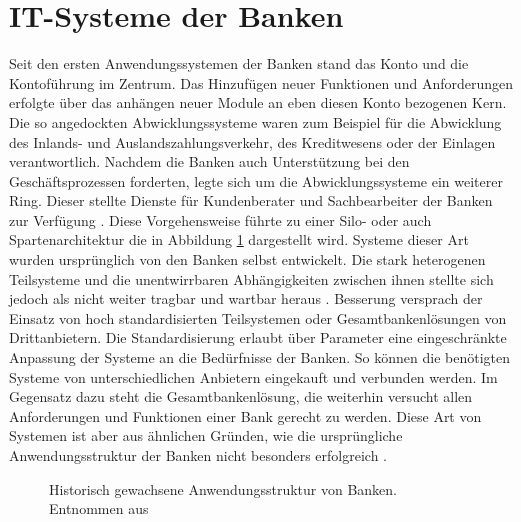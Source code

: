 \documentclass[12pt,oneside,a4paper,parskip]{scrbook}
\begin{document}
\section{IT-Systeme der Banken}
Seit den ersten Anwendungssystemen der Banken stand das Konto und die Kontoführung im Zentrum. Das Hinzufügen neuer Funktionen und Anforderungen erfolgte über das anhängen neuer Module an eben diesen Konto bezogenen Kern. Die so angedockten Abwicklungssysteme waren zum Beispiel für die Abwicklung des Inlands- und Auslandszahlungsverkehr, des Kreditwesens oder der Einlagen verantwortlich. Nachdem die Banken auch Unterstützung bei den Geschäftsprozessen forderten, legte sich um die Abwicklungssysteme ein weiterer Ring. Dieser stellte Dienste für Kundenberater und Sachbearbeiter der Banken zur Verfügung \cite[18-20]{ITidF}\cite{SuPdIiB}. Diese Vorgehensweise führte zu einer Silo- oder auch Spartenarchitektur die in Abbildung \ref{zwiebel} dargestellt wird. Systeme dieser Art wurden ursprünglich von den Banken selbst entwickelt. Die stark heterogenen Teilsysteme und die unentwirrbaren Abhängigkeiten zwischen ihnen stellte sich jedoch als nicht weiter tragbar und wartbar heraus \cite{bankEnzy}\cite{SuPdIiB}\cite[52]{ITidF}. Besserung versprach der Einsatz von hoch standardisierten Teilsystemen oder Gesamtbankenlösungen von Drittanbietern. Die Standardisierung erlaubt über Parameter eine eingeschränkte Anpassung der Systeme an die Bedürfnisse der Banken. So können die benötigten Systeme von unterschiedlichen Anbietern eingekauft und verbunden werden. Im Gegensatz dazu steht die Gesamtbankenlösung, die weiterhin versucht allen Anforderungen und Funktionen einer Bank gerecht zu werden. Diese Art von Systemen ist aber aus ähnlichen Gründen, wie die ursprüngliche Anwendungsstruktur der Banken nicht besonders erfolgreich \cite[S. 56 ff.]{ITidF}. 

\begin{figure}
  \caption[Historische Anwendungsstruktur von Banken]{Historisch gewachsene Anwendungsstruktur von Banken. Entnommen aus \cite{SuPdIiB}}
  \label{zwiebel}
\end{figure}
\end{document}
